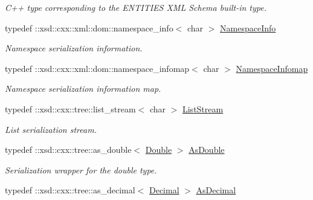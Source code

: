 \begin{DoxyCompactItemize}
\begin{DoxyCompactList}\small\item\em C++ type corresponding to the ENTITIES XML Schema built-\/in type. \item\end{DoxyCompactList}\item 
\hypertarget{namespacexml__schema_a8173946ae3599b216a89eb59b530d892}{
typedef ::xsd::cxx::xml::dom::namespace\_\-info$<$ char $>$ \hyperlink{namespacexml__schema_a8173946ae3599b216a89eb59b530d892}{NamespaceInfo}}
\label{namespacexml__schema_a8173946ae3599b216a89eb59b530d892}

\begin{DoxyCompactList}\small\item\em Namespace serialization information. \item\end{DoxyCompactList}\item 
\hypertarget{namespacexml__schema_a4581dcaae6f82c9ed74ba650a45c0952}{
typedef ::xsd::cxx::xml::dom::namespace\_\-infomap$<$ char $>$ \hyperlink{namespacexml__schema_a4581dcaae6f82c9ed74ba650a45c0952}{NamespaceInfomap}}
\label{namespacexml__schema_a4581dcaae6f82c9ed74ba650a45c0952}

\begin{DoxyCompactList}\small\item\em Namespace serialization information map. \item\end{DoxyCompactList}\item 
\hypertarget{namespacexml__schema_aa893a219e389ee6716fe6545a6bffe7e}{
typedef ::xsd::cxx::tree::list\_\-stream$<$ char $>$ \hyperlink{namespacexml__schema_aa893a219e389ee6716fe6545a6bffe7e}{ListStream}}
\label{namespacexml__schema_aa893a219e389ee6716fe6545a6bffe7e}

\begin{DoxyCompactList}\small\item\em List serialization stream. \item\end{DoxyCompactList}\item 
\hypertarget{namespacexml__schema_aa545905674840a1a78372d01225678ad}{
typedef ::xsd::cxx::tree::as\_\-double$<$ \hyperlink{namespacexml__schema_ad4d9be8ec9a5415e9522df5aaa17f791}{Double} $>$ \hyperlink{namespacexml__schema_aa545905674840a1a78372d01225678ad}{AsDouble}}
\label{namespacexml__schema_aa545905674840a1a78372d01225678ad}

\begin{DoxyCompactList}\small\item\em Serialization wrapper for the double type. \item\end{DoxyCompactList}\item 
\hypertarget{namespacexml__schema_a251ac89cf4eabb9ca4f83331d3851e55}{
typedef ::xsd::cxx::tree::as\_\-decimal$<$ \hyperlink{namespacexml__schema_a9ec4af2c5785716c4ecf9e1826163098}{Decimal} $>$ \hyperlink{namespacexml__schema_a251ac89cf4eabb9ca4f83331d3851e55}{AsDecimal}}
\label{namespacexml__schema_a251ac89cf4eabb9ca4f83331d3851e55}


\end{DoxyCompactItemize}
